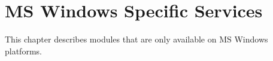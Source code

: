 \chapter{MS Windows Specific Services}


This chapter describes modules that are only available on MS Windows
platforms.


\localmoduletable

